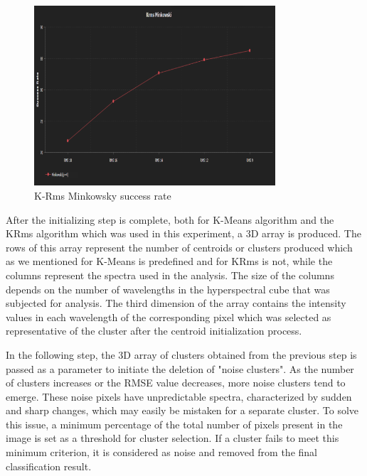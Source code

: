 \documentclass{article}
\begin{document}
{                    \begin{figure}[thb]
                        \centering
                        \includegraphics[width=0.8\textwidth]{Figures/krmsMink.PNG}
                        \caption{K-Rms Minkowsky success rate}
                        \label{fig:my_label}
                    \end{figure}
                    \clearpage
                    \newpage
                    After the initializing step is complete, both for K-Means algorithm and the KRms algorithm which was used in this experiment, a 3D array is produced. The rows of this array represent the number of centroids or clusters produced which as we mentioned for K-Means is predefined and for KRms is not, while the columns represent the spectra used in the analysis. The size of the columns depends on the number of wavelengths in the hyperspectral cube that was subjected for analysis. The third dimension of the array contains the intensity values in each wavelength of the corresponding pixel which was selected as representative of the cluster after the centroid initialization process.\par
                    In the following step, the 3D array of clusters obtained from the previous step is passed as a parameter to initiate the deletion of "noise clusters". As the number of clusters increases or the RMSE value decreases, more noise clusters tend to emerge. These noise pixels have unpredictable spectra, characterized by sudden and sharp changes, which may easily be mistaken for a separate cluster. To solve this issue, a minimum percentage of the total number of pixels present in the image is set as a threshold for cluster selection. If a cluster fails to meet this minimum criterion, it is considered as noise and removed from the final classification result.\par
}
\end{document}
